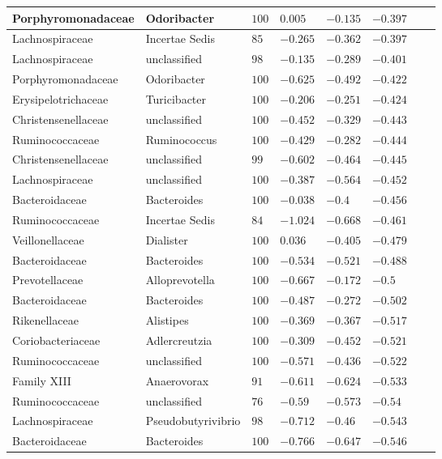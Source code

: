 \begin{table}[!ht]
\begin{tiny}
\begin{tabular}{|l|l|l|l|l|l|l|l|}
Porphyromonadaceae & Odoribacter & $100$ & $0.005$ & $-0.135$ & $-0.397$ \\ \hline
Lachnospiraceae & Incertae Sedis & $85$ & $-0.265$ & $-0.362$ & $-0.397$ \\ \hline
Lachnospiraceae & unclassified & $98$ & $-0.135$ & $-0.289$ & $-0.401$ \\ \hline
Porphyromonadaceae & Odoribacter & $100$ & $-0.625$ & $-0.492$ & $-0.422$ \\ \hline
Erysipelotrichaceae & Turicibacter & $100$ & $-0.206$ & $-0.251$ & $-0.424$ \\ \hline
Christensenellaceae & unclassified & $100$ & $-0.452$ & $-0.329$ & $-0.443$ \\ \hline
Ruminococcaceae & Ruminococcus & $100$ & $-0.429$ & $-0.282$ & $-0.444$ \\ \hline
Christensenellaceae & unclassified & $99$ & $-0.602$ & $-0.464$ & $-0.445$ \\ \hline
Lachnospiraceae & unclassified & $100$ & $-0.387$ & $-0.564$ & $-0.452$ \\ \hline
Bacteroidaceae & Bacteroides & $100$ & $-0.038$ & $-0.4$ & $-0.456$ \\ \hline
Ruminococcaceae & Incertae Sedis & $84$ & $-1.024$ & $-0.668$ & $-0.461$ \\ \hline
Veillonellaceae & Dialister & $100$ & $0.036$ & $-0.405$ & $-0.479$ \\ \hline
Bacteroidaceae & Bacteroides & $100$ & $-0.534$ & $-0.521$ & $-0.488$ \\ \hline
Prevotellaceae & Alloprevotella & $100$ & $-0.667$ & $-0.172$ & $-0.5$ \\ \hline
Bacteroidaceae & Bacteroides & $100$ & $-0.487$ & $-0.272$ & $-0.502$ \\ \hline
Rikenellaceae & Alistipes & $100$ & $-0.369$ & $-0.367$ & $-0.517$ \\ \hline
Coriobacteriaceae & Adlercreutzia & $100$ & $-0.309$ & $-0.452$ & $-0.521$ \\ \hline
Ruminococcaceae & unclassified & $100$ & $-0.571$ & $-0.436$ & $-0.522$ \\ \hline
Family XIII & Anaerovorax & $91$ & $-0.611$ & $-0.624$ & $-0.533$ \\ \hline
Ruminococcaceae & unclassified & $76$ & $-0.59$ & $-0.573$ & $-0.54$ \\ \hline
Lachnospiraceae & Pseudobutyrivibrio & $98$ & $-0.712$ & $-0.46$ & $-0.543$ \\ \hline
Bacteroidaceae & Bacteroides & $100$ & $-0.766$ & $-0.647$ & $-0.546$ \\ \hline

\end{tabular}
\end{tiny}
\end{table}
